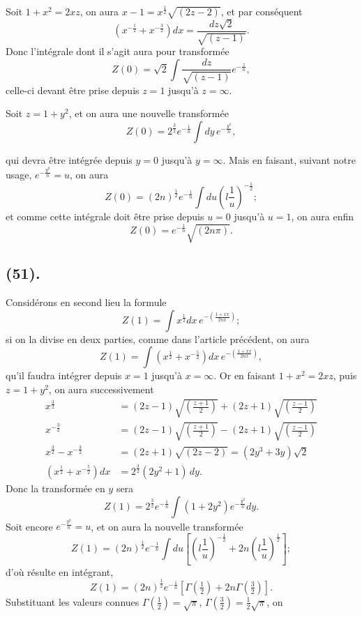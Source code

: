 \documentclass{article}
\begin{document}
Soit $1+x^{2}=2xz$, on aura $x-1=x^{\frac{1}{2}}\sqrt{(2z-2)}$, et par conséquent
\[ \left(x^{-\frac{1}{2}}+x^{-\frac{3}{2}}\right)dx=\frac{dz\sqrt{2}}{\sqrt{(z-1)}}. \]
Donc l'intégrale dont il s'agit aura pour transformée
\[ Z(0)=\sqrt{2}\int\frac{dz}{\sqrt{(z-1)}}e^{-\frac{z}{n}}, \]
celle-ci devant être prise depuis $z=1$ jusqu'à $z=\infty$.

Soit $z=1+y^{2}$, et on aura une nouvelle transformée
\[ Z(0)=2^{\frac{3}{2}}e^{-\frac{1}{n}}\int dy\,e^{-\frac{y^{2}}{n}}, \]

qui devra être intégrée depuis $y=0$ jusqu'à $y=\infty$. Mais en faisant, suivant notre usage, $e^{-\frac{y^{2}}{n}}=u$, on aura
\[ Z(0)=(2n)^{\frac{1}{2}}e^{-\frac{1}{n}}\int du\left(l\frac{1}{u}\right)^{-\frac{1}{2}}; \]
et comme cette intégrale doit être prise depuis $u=0$ jusqu'à $u=1$, on aura enfin
\[ Z(0)=e^{-\frac{1}{n}}\sqrt{(2n\pi)}. \tag{1} \]

\subsection*{(51).}

Considérons en second lieu la formule
\[ Z(1)=\int x^{\frac{1}{2}}dx\,e^{-\left(\frac{1+xx}{2nx}\right)}; \]
si on la divise en deux parties, comme dans l'article précédent, on aura
\[ Z(1)=\int\left(x^{\frac{1}{2}}+x^{-\frac{5}{2}}\right)dx\,e^{-\left(\frac{1+xx}{2nx}\right)}, \]
qu'il faudra intégrer depuis $x=1$ jusqu'à $x=\infty$. Or en faisant $1+x^{2}=2xz$, puis $z=1+y^{2}$, on aura successivement
\[ \begin{aligned} x^{\frac{3}{2}}&=(2z-1)\sqrt{\left(\frac{z+1}{2}\right)}+(2z+1)\sqrt{\left(\frac{z-1}{2}\right)}\\ x^{-\frac{3}{2}}&=(2z-1)\sqrt{\left(\frac{z+1}{2}\right)}-(2z+1)\sqrt{\left(\frac{z-1}{2}\right)}\\ x^{\frac{3}{2}}-x^{-\frac{3}{2}}&=(2z+1)\sqrt{(2z-2)}=(2y^{3}+3y)\sqrt{2}\\ \left(x^{\frac{1}{2}}+x^{-\frac{5}{2}}\right)dx&=2^{\frac{3}{2}}(2y^{2}+1)\,dy. \end{aligned} \]
Donc la transformée en $y$ sera
\[ Z(1)=2^{\frac{3}{2}}e^{-\frac{1}{n}}\int(1+2y^{2})e^{-\frac{y^{2}}{n}}dy. \]
Soit encore $e^{-\frac{y^{2}}{n}}=u$, et on aura la nouvelle transformée
\[ Z(1)=(2n)^{\frac{1}{2}}e^{-\frac{1}{n}}\int du\left[\left(l\frac{1}{u}\right)^{-\frac{1}{2}}+2n\left(l\frac{1}{u}\right)^{\frac{1}{2}}\right]; \]
d'où résulte en intégrant,
\[ Z(1)=(2n)^{\frac{1}{2}}e^{-\frac{1}{n}}\left[\Gamma(\tfrac{1}{2})+2n\Gamma(\tfrac{3}{2})\right]. \]
Substituant les valeurs connues $\Gamma(\frac{1}{2})=\sqrt{\pi}$, $\Gamma(\frac{3}{2})=\frac{1}{2}\sqrt{\pi}$, on
\end{document}
